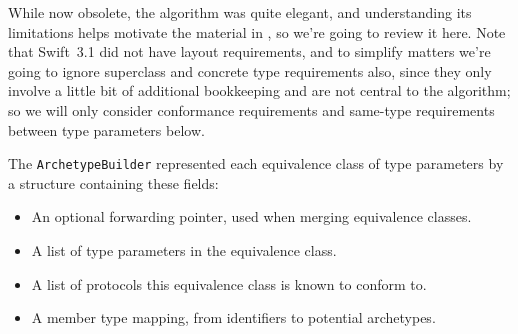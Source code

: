 \documentclass[../generics]{subfiles}
\begin{document}
While now obsolete, the algorithm was quite elegant, and understanding its limitations helps motivate the material in , so we're going to review it here. Note that Swift~3.1 did not have layout requirements, and to simplify matters we're going to ignore superclass and concrete type requirements also, since they only involve a little bit of additional bookkeeping and are not central to the algorithm; so we will only consider conformance requirements and same-type requirements between type parameters below.

The \texttt{ArchetypeBuilder} represented each equivalence class of type parameters by a structure containing these fields:
\begin{itemize}
\item An optional forwarding pointer, used when merging equivalence classes.
\item A list of type parameters in the equivalence class.
\item A list of protocols this equivalence class is known to conform to.
\item A member type mapping, from identifiers to potential archetypes.
\end{itemize}
\end{document}

